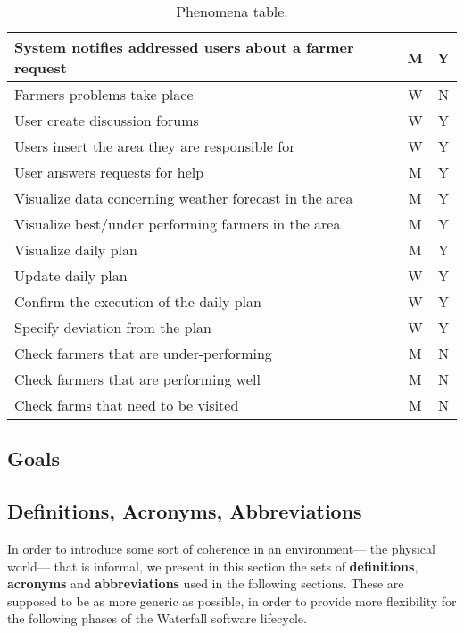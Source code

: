 \begin{table}[H]
\begin{tabular}{|l|c|c|}
        \hline
        System notifies addressed users about a farmer request          &   M   &   Y \\
        \hline
        Farmers problems take place                                     &   W   &   N \\
        \hline
        User create discussion forums                                   &   W   &   Y \\
        \hline
        Users insert the area they are responsible for                  &   W   &   Y \\
        \hline
        User answers requests for help                                  &   M   &   Y \\
        \hline
        Visualize data concerning weather forecast in the area          &   M   &   Y \\
        \hline
        Visualize best/under performing farmers in the area             &   M   &   Y \\
        \hline
        Visualize daily plan                                            &   M   &   Y \\
        \hline
        Update daily plan                                               &   W   &   Y \\
        \hline
        Confirm the execution of the daily plan                         &   W   &   Y \\
        \hline
        Specify deviation from the plan                                 &   W   &   Y \\
        \hline
        Check farmers that are under-performing                         &   M   &   N \\
        \hline
        Check farmers that are performing well                          &   M   &   N \\
        \hline
        Check farms that need to be visited                             &   M   &   N \\
        \hline
    \end{tabular}
    
    \caption{\label{tab:phenomena_table}Phenomena table.}
    
\end{table}

\subsection{Goals}

\subsection{Definitions, Acronyms, Abbreviations}
In order to introduce some sort of coherence in an environment--- the physical world--- that is informal, we present in this section the sets of \textbf{definitions}, \textbf{acronyms} and \textbf{abbreviations} used in the following sections. These are supposed to be as more generic as possible, in order to provide more flexibility for the following phases of the Waterfall software lifecycle.
